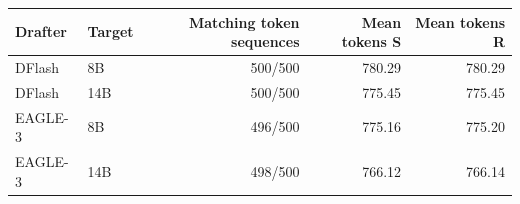 \begin{tabular}{llrrr}
\toprule
Drafter & Target & Matching token sequences & Mean tokens S & Mean tokens R \\
\midrule
DFlash & 8B & 500/500 & 780.29 & 780.29 \\
DFlash & 14B & 500/500 & 775.45 & 775.45 \\
EAGLE-3 & 8B & 496/500 & 775.16 & 775.20 \\
EAGLE-3 & 14B & 498/500 & 766.12 & 766.14 \\
\bottomrule
\end{tabular}
